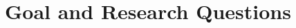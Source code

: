 \begin{comment}
The field of Neural Radiance Fields (NeRF) has experienced a surge in research and development over the past years, with models becoming exponentially better and more performant. These models have demonstrated impressive capabilities in efficiently reconstructing 3D scenes from 2D images, opening up new frontiers in many applications including autonomous driving. As an example, Wayve, a pioneer in the self-driving vehicle industry, has already integrated NeRF technology into their system (\textbf{Cite Nvidia GTC Talk}). As with most large-scale NeRF implementations with commercial applications, their tools and code remain proprietary, rendering them inaccessible for wider research purposes. However, this advancement underscores the potential significance of the technology and motivates further exploration of its capabilities and potential applications.

One particular area of interest is the ability to create a pipeline that captures data and reconstructs larger scenes, facilitating the application of NeRF models in large-scale environments. A functional pipeline could further enhance the performance of systems like Wayve's and lead to broader implications in other sectors requiring 3D scene reconstruction.

There are multiple key steps to achieving the goal of designing and developing an end-to-end pipeline that enables the capture and reconstruction of large 3D scenes. A pragmatic approach would first create a data capture pipeline in a controllable virtual environment, which in turn is connected to a NeRF pipeline. Having constructed the pipeline it could be used to create a baseline to compare future iterations of scene capture and NeRF-settings, allowing steady improvement. With a functional pipeline, and an acquired baseline, the pipeline could be extended to enable the input of real data.

Given the importance and potential of this research in the evolving landscape of 3D scene reconstruction, this thesis seeks to explore these steps and further contribute to the knowledge and application of NeRF technology.
\end{comment}









\section{Goal and Research Questions}

